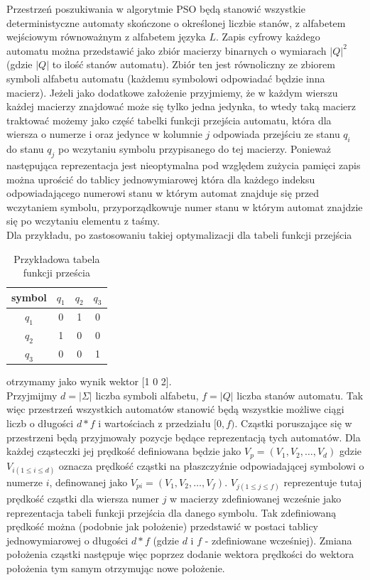 \documentclass[runningheads,a4paper]{llncs}
\begin{document}
Przestrzeń poszukiwania w algorytmie PSO będą stanowić wszystkie deterministyczne automaty skończone o określonej liczbie stanów, z alfabetem wejściowym równoważnym z alfabetem języka $L$. Zapis cyfrowy każdego automatu można przedstawić jako zbiór macierzy binarnych o wymiarach $|Q|^2$ (gdzie $|Q|$ to ilość stanów automatu). Zbiór ten jest równoliczny ze zbiorem symboli alfabetu automatu (każdemu symbolowi odpowiadać będzie inna macierz). Jeżeli jako dodatkowe założenie przyjmiemy, że w każdym wierszu każdej macierzy znajdować może się tylko jedna jedynka, to wtedy taką macierz traktować możemy jako część tabelki funkcji przejścia automatu, która dla wiersza o numerze i oraz jedynce w kolumnie $j$ odpowiada przejściu ze stanu $q_{i}$ do stanu $q_{j}$ po wczytaniu symbolu przypisanego do tej macierzy. Ponieważ następująca reprezentacja jest nieoptymalna pod względem zużycia pamięci zapis można uprościć do tablicy jednowymiarowej która dla każdego indeksu odpowiadającego numerowi stanu w którym automat znajduje się przed wczytaniem symbolu, przyporządkowuje numer stanu w którym automat znajdzie się po wczytaniu elementu z taśmy.\\

Dla przykładu, po zastosowaniu takiej optymalizacji dla tabeli funkcji przejścia 
\begin{table}[]
\centering
\begin{tabular}{c|c|c|c|}
symbol                   & $q_{1}$ & $q_{2}$ & $q_{3}$ \\ \hline
\multicolumn{1}{c|}{$q_{1}$} & 0  & 1  & 0  \\ \hline
\multicolumn{1}{c|}{$q_{2}$} & 1  & 0  & 0  \\ \hline
\multicolumn{1}{c|}{$q_{3}$} & 0  & 0  & 1  \\ \hline
\end{tabular}
\vspace{0.5cm}
\caption{Przykładowa tabela funkcji prześcia}
\end{table}

otrzymamy jako wynik wektor [1 0 2].\\

Przyjmijmy $d = |\Sigma|$ liczba symboli alfabetu, $f = |Q|$ liczba stanów automatu. Tak więc przestrzeń wszystkich automatów stanowić będą wszystkie możliwe ciągi liczb o długości $d*f$ i wartościach z przedziału $[0, f)$. Cząstki poruszające się w przestrzeni będą przyjmowały pozycje będące reprezentacją tych automatów. Dla każdej cząsteczki jej prędkość definiowana będzie jako $V_{p} = (V_{1}, V_{2}, …, V_{d})$ gdzie $V_{i (1 \leq i \leq d)}$ oznacza prędkość cząstki na płaszczyźnie odpowiadającej symbolowi o numerze $i$, definowanej jako $V_{pi} = (V_{1}, V_{2}, …, V_{f})$. $V_{j (1 \leq j \leq f)}$ reprezentuje tutaj prędkość cząstki dla wiersza numer $j$ w macierzy zdefiniowanej wcześnie jako reprezentacja tabeli funkcji przejścia dla danego symbolu. Tak zdefiniowaną prędkość można (podobnie jak położenie) przedstawić w postaci tablicy jednowymiarowej o długości $d*f$ (gdzie $d$ i $f$ - zdefiniowane wcześniej). Zmiana położenia cząstki następuje więc poprzez dodanie wektora prędkości do wektora położenia tym samym otrzymując nowe położenie.
\end{document}
